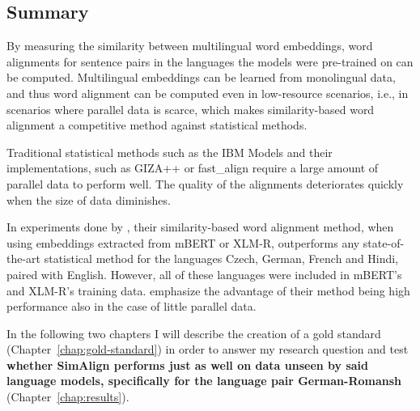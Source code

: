 \subsection{Summary}
By measuring the similarity between multilingual word embeddings, word alignments for sentence pairs in the languages the models were pre-trained on can be computed. 
Multilingual embeddings can be learned from monolingual data, and thus word alignment can be computed even in low-resource scenarios, i.e., in scenarios where parallel data is scarce, which makes similarity-based word alignment a competitive method against statistical methods. 

Traditional statistical methods such as the IBM Models \autocite{brown-etal-1993-mathematics} and their implementations, such as GIZA++ \autocite{och-ney-2003-smt} or fast\_align \autocite{dyer-etal-2013-simple} require a large amount of parallel data to perform well.
The quality of the alignments deteriorates quickly when the size of data diminishes\footnotemark. 


In experiments done by \textcite{jalili-sabet-etal-2020-simalign}, their similarity-based word alignment method, when using embeddings extracted from mBERT or XLM-R, outperforms any state-of-the-art statistical method for the languages Czech, German, French and Hindi, paired with English. 
However, all of these languages were included in mBERT's and XLM-R's training data. 
\textcite{jalili-sabet-etal-2020-simalign} emphasize the advantage of their method being high performance also in the case of little  parallel data.

In the following two chapters I will describe the creation of a gold standard (Chapter~\ref{chap:gold-standard}) in order to answer my research question and test \textbf{whether SimAlign performs just as well on data unseen by said language models, specifically for the language pair German-Romansh} (Chapter~\ref{chap:results}).



